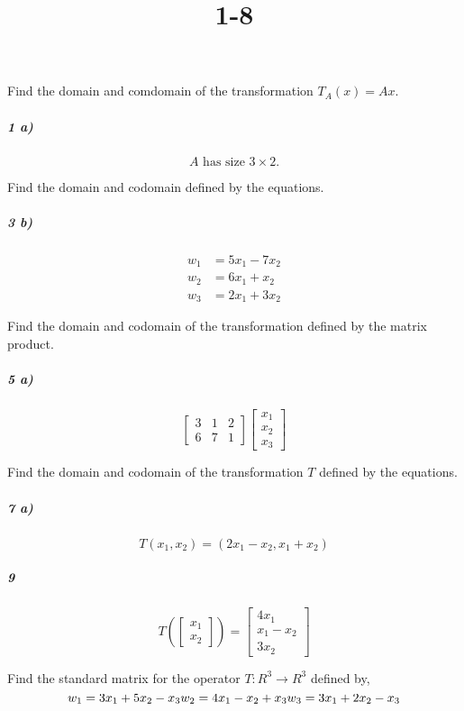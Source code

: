 \documentclass[fleqn]{article}
\title{1-8}
\begin{document}
\maketitle
\pagebreak
 Find the domain and comdomain of the transformation $T_A(x) = Ax$.

\subparagraph{1 a)}

\[
A\text{ has size }3 \times 2.
\]
\vfill

 Find the domain and codomain defined by the equations.

\subparagraph{3 b)}

\[
\begin{aligned} w_1 &= 5x_1 - 7x_2 \\ w_2 &= 6x_1 + x_2 \\ w_3 &= 2x_1 + 3x_2 \end{aligned}
\]
\vfill


\pagebreak
 Find the domain and codomain of the transformation defined by the matrix product.

\subparagraph{5 a)}

\[
\begin{bmatrix} 3 & 1 & 2 \\ 6 & 7 & 1 \end{bmatrix} \begin{bmatrix} x_1 \\ x_2 \\ x_3 \end{bmatrix}
\]
\vfill

 Find the domain and codomain of the transformation $T$ defined by the equations.

\subparagraph{7 a)}

\[
T(x_1, x_2) = (2x_1 - x_2, x_1 + x_2)
\]
\vfill


\pagebreak


\subparagraph{9}

\[
T\left(\begin{bmatrix}x_1\\x_2\end{bmatrix}\right) = \begin{bmatrix}4x_1\\x_1-x_2\\3x_2\end{bmatrix}
\]
\vfill

Find the standard matrix for the operator $T: R^3 \to R^3$ defined by, 
\[ 
    w_1 = 3x_1 + 5x_2 - x_3 \\ w_2 = 4x_1 - x_2 + x_3 \\ w_3 = 3x_1 + 2x_2 - x_3 
\] 
\end{document}
